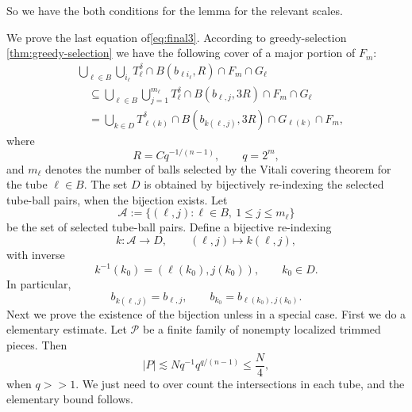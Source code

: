 \documentclass[11pt, letterpaper]{nyjm}
\begin{document}
	So we have the both conditions for the lemma for the relevant scales.
	
	
	
	We prove the last equation of\eqref{eq:final3}.
	According to greedy-selection \ref{thm:greedy-selection} we have the following cover of a major portion of $F_m$: 
	\[
	\begin{aligned}
		&\bigcup_{\ell\in B}\bigcup_{i_\ell}
		T_\ell^\delta
		\cap B(b_{\ell i_\ell},R)
		\cap F_m
		\cap G_\ell\\
		&\quad\subseteq
		\bigcup_{\ell\in B}\bigcup_{j=1}^{m_\ell}
		T_\ell^\delta
		\cap B(b_{\ell, j},3R)
		\cap F_m
		\cap G_\ell\\
		&\quad=
		\bigcup_{k\in D}
		T_{\ell(k)}^\delta
		\cap B(b_{k(\ell,j)},3R)
		\cap G_{\ell(k)}
		\cap F_m,
	\end{aligned}
	\]
	where
	\[
	R=Cq^{-1/(n-1)},\qquad q=2^m,
	\]
	and $m_\ell$ denotes the number of balls selected by
	the Vitali covering theorem for the tube $\ell\in B$.
	The set $D$ is obtained by bijectively re-indexing the
	selected tube-ball pairs, when the bijection exists.
	Let
	\[
	\mathcal A
	:=
	\{(\ell,j):\ell\in B,\ 1\le j\le m_\ell\}
	\]
	be the set of selected tube-ball pairs.
	Define a bijective re-indexing
	\[
	k:\mathcal A\longrightarrow D,
	\qquad
	(\ell,j)\longmapsto k(\ell,j),
	\]
	with inverse
	\[
	k^{-1}(k_0)
	=
	(\ell(k_0),j(k_0)),
	\qquad k_0\in D.
	\]
	In particular,
	\[
	b_{k(\ell,j)}=b_{\ell,j},
	\qquad
	b_{k_0}=b_{\ell(k_0),j(k_0)}.
	\]
	Next we prove the existence of the bijection unless in a special case. First we do a elementary estimate. Let $\mathcal P$ be a finite family of nonempty
	localized trimmed pieces. Then 
	\begin{equation} \label{eq:elementary-bound}
		|P| \lesssim Nq^{-1}q^{q/(n-1)} \leq \frac{N}{4},
	\end{equation}
	when $q >> 1.$ We just need to over count the intersections in each tube, and the elementary bound follows.  
	
\end{document}
